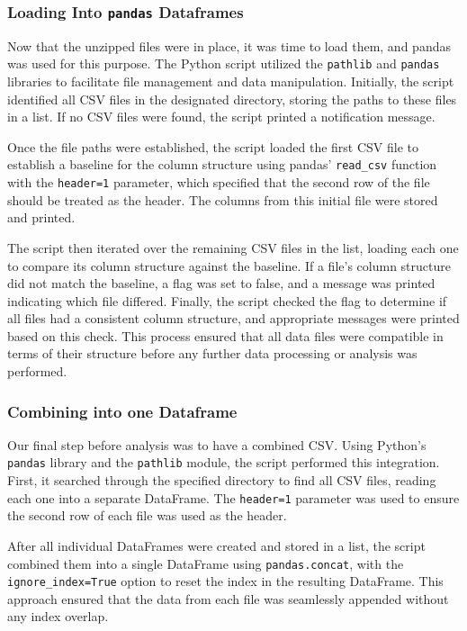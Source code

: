 \documentclass[mstat,12pt]{unswthesis}
\begin{document}
\subsubsection{\texorpdfstring{Loading Into \texttt{pandas}
Dataframes}{Loading Into pandas Dataframes}}\label{loading-into-pandas-dataframes}

Now that the unzipped files were in place, it was time to load them, and
pandas was used for this purpose. The Python script utilized the
\texttt{pathlib} and \texttt{pandas} libraries to facilitate file
management and data manipulation. Initially, the script identified all
CSV files in the designated directory, storing the paths to these files
in a list. If no CSV files were found, the script printed a notification
message.

Once the file paths were established, the script loaded the first CSV
file to establish a baseline for the column structure using pandas'
\texttt{read\_csv} function with the \texttt{header=1} parameter, which
specified that the second row of the file should be treated as the
header. The columns from this initial file were stored and printed.

The script then iterated over the remaining CSV files in the list,
loading each one to compare its column structure against the baseline.
If a file's column structure did not match the baseline, a flag was set
to false, and a message was printed indicating which file differed.
Finally, the script checked the flag to determine if all files had a
consistent column structure, and appropriate messages were printed based
on this check. This process ensured that all data files were compatible
in terms of their structure before any further data processing or
analysis was performed.

\subsubsection{Combining into one
Dataframe}\label{combining-into-one-dataframe}

Our final step before analysis was to have a combined CSV. Using
Python's \texttt{pandas} library and the \texttt{pathlib} module, the
script performed this integration. First, it searched through the
specified directory to find all CSV files, reading each one into a
separate DataFrame. The \texttt{header=1} parameter was used to ensure
the second row of each file was used as the header.

After all individual DataFrames were created and stored in a list, the
script combined them into a single DataFrame using
\texttt{pandas.concat}, with the \texttt{ignore\_index=True} option to
reset the index in the resulting DataFrame. This approach ensured that
the data from each file was seamlessly appended without any index
overlap.
\end{document}
